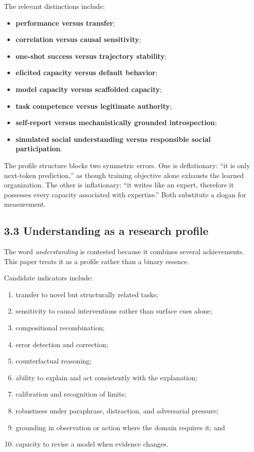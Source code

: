 \documentclass[
  11pt,
]{article}
\providecommand{\tightlist}{%
  \setlength{\itemsep}{0pt}\setlength{\parskip}{0pt}}
\begin{document}
The relevant distinctions include:

\begin{itemize}
\tightlist
\item
  \textbf{performance versus transfer};
\item
  \textbf{correlation versus causal sensitivity};
\item
  \textbf{one-shot success versus trajectory stability};
\item
  \textbf{elicited capacity versus default behavior};
\item
  \textbf{model capacity versus scaffolded capacity};
\item
  \textbf{task competence versus legitimate authority};
\item
  \textbf{self-report versus mechanistically grounded introspection};
\item
  \textbf{simulated social understanding versus responsible social
  participation}.
\end{itemize}

The profile structure blocks two symmetric errors. One is deflationary:
``it is only next-token prediction,'' as though training objective alone
exhausts the learned organization. The other is inflationary: ``it
writes like an expert, therefore it possesses every capacity associated
with expertise.'' Both substitute a slogan for measurement.

\subsection{3.3 Understanding as a research
profile}\label{understanding-as-a-research-profile}

The word \emph{understanding} is contested because it combines several
achievements. This paper treats it as a profile rather than a binary
essence.

Candidate indicators include:

\begin{enumerate}
\def\labelenumi{\arabic{enumi}.}
\tightlist
\item
  transfer to novel but structurally related tasks;
\item
  sensitivity to causal interventions rather than surface cues alone;
\item
  compositional recombination;
\item
  error detection and correction;
\item
  counterfactual reasoning;
\item
  ability to explain and act consistently with the explanation;
\item
  calibration and recognition of limits;
\item
  robustness under paraphrase, distraction, and adversarial pressure;
\item
  grounding in observation or action where the domain requires it; and
\item
  capacity to revise a model when evidence changes.
\end{enumerate}
\end{document}
